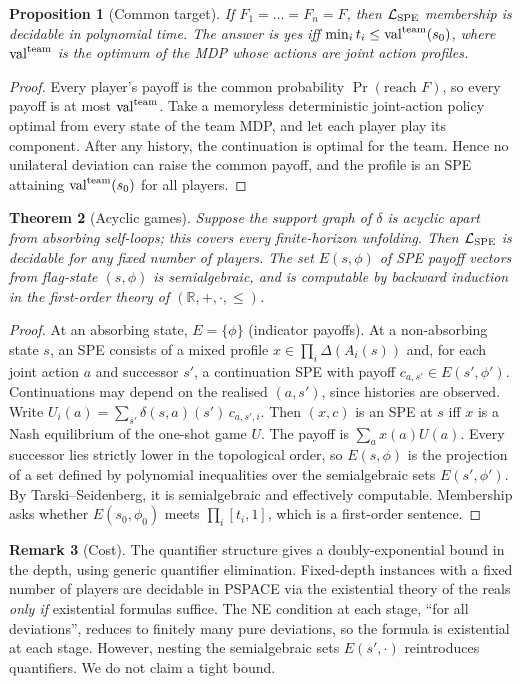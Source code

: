 \documentclass[11pt]{article}
\newtheorem{theorem}{Theorem}
\newtheorem{proposition}[theorem]{Proposition}
\theoremstyle{definition}
\newtheorem{remark}[theorem]{Remark}
\begin{document}
\begin{proposition}[Common target]\label{prop:common}
If $F_1=\dots=F_n=F$, then $\mathcal L_{\rm SPE}$ membership is decidable in polynomial time. The answer is yes iff
$\min_it_i\le\mathrm{val}^{\rm team}(s_0)$, where $\mathrm{val}^{\rm team}$ is the optimum of the MDP whose actions are
\emph{joint} action profiles.
\end{proposition}
\begin{proof}
Every player's payoff is the common probability $\Pr(\text{reach }F)$, so every payoff is at most $\mathrm{val}^{\rm team}$.
Take a memoryless deterministic joint-action policy optimal from every state of the team MDP, and let each player play its
component. After any history, the continuation is optimal for the team. Hence no unilateral deviation can raise the common
payoff, and the profile is an SPE attaining $\mathrm{val}^{\rm team}(s_0)$ for all players.
\end{proof}

\begin{theorem}[Acyclic games]\label{thm:acyclic}
Suppose the support graph of $\delta$ is acyclic apart from absorbing self-loops; this covers every finite-horizon
unfolding. Then $\mathcal L_{\rm SPE}$ is decidable for any fixed number of players. The set $E(s,\phi)$ of SPE payoff
vectors from flag-state $(s,\phi)$ is semialgebraic, and is computable by backward induction in the first-order theory of
$(\mathbb R,+,\cdot,\le)$.
\end{theorem}
\begin{proof}
At an absorbing state, $E=\{\phi\}$ (indicator payoffs). At a non-absorbing state $s$, an SPE consists of a mixed profile
$x\in\prod_i\Delta(A_i(s))$ and, for each joint action $a$ and successor $s'$, a continuation SPE with payoff
$c_{a,s'}\in E(s',\phi')$. Continuations may depend on the realised $(a,s')$, since histories are observed. Write
$U_i(a)=\sum_{s'}\delta(s,a)(s')\,c_{a,s',i}$. Then $(x,c)$ is an SPE at $s$ iff $x$ is a Nash equilibrium of the
one-shot game $U$. The payoff is $\sum_ax(a)U(a)$. Every successor lies strictly lower in the topological order, so
$E(s,\phi)$ is the projection of a set defined by polynomial inequalities over the semialgebraic sets $E(s',\phi')$. By
Tarski--Seidenberg, it is semialgebraic and effectively computable. Membership asks whether $E(s_0,\phi_0)$ meets
$\prod_i[t_i,1]$, which is a first-order sentence.
\end{proof}

\begin{remark}[Cost]
The quantifier structure gives a doubly-exponential bound in the depth, using generic quantifier elimination.
Fixed-depth instances with a fixed number of players are decidable in PSPACE via the existential theory of the reals
\emph{only if} existential formulas suffice. The NE condition at each stage, ``for all deviations'', reduces to finitely
many pure deviations, so the formula is existential at each stage. However, nesting the semialgebraic sets $E(s',\cdot)$
reintroduces quantifiers. We do not claim a tight bound.
\end{remark}
\end{document}
